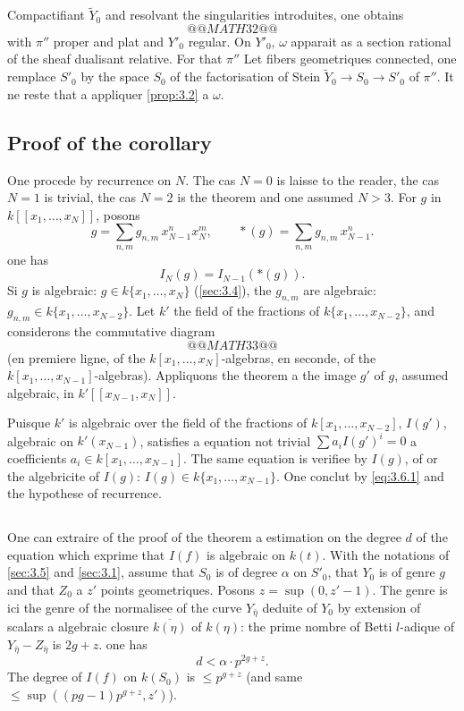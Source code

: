 \documentclass[12pt,a4paper]{article}
\theoremstyle{plain}
\theoremstyle{definition}
\theoremstyle{remark}
\begin{document}
Compactifiant $\widetilde{Y}_0$ and resolvant the singularities introduites, one obtains
\[
@@MATH32@@
\]
with $\pi''$ proper and plat and $Y'_0$ regular. On $Y'_0$, $\omega$ apparait as a section
rational of the sheaf dualisant relative. For that $\pi''$ Let fibers geometriques
connected, one remplace $S'_0$ by the space $S_0$ of the factorisation of Stein
$\widetilde{Y}_0\to S_0\to S'_0$ of $\pi''$. It ne reste that a appliquer \ref{prop:3.2} a $\omega$.

\subsection{Proof of the corollary}\label{sec:3.6}

One procede by recurrence on $N$. The cas $N=0$ is laisse to the reader, the cas $N=1$
is trivial, the cas $N=2$ is the theorem and one assumed $N>3$. For $g$ in
$k[[x_1,\dots,x_N]]$, posons
\[
g=\sum_{n,m}g_{n,m}\,x_{N-1}^n x_N^m,\qquad *(g)=\sum_{n,m}g_{n,m}\,x_{N-1}^n.
\]
one has
\begin{equation}\label{eq:3.6.1}
I_N(g)=I_{N-1}(*(g)).
\end{equation}
Si $g$ is algebraic: $g\in k\{x_1,\dots,x_N\}$ (\ref{sec:3.4}), the $g_{n,m}$ are
algebraic: $g_{n,m}\in k\{x_1,\dots,x_{N-2}\}$. Let $k'$ the field of the fractions of
$k\{x_1,\dots,x_{N-2}\}$, and considerons the commutative diagram
\[
@@MATH33@@
\]
(en premiere ligne, of the $k[x_1,\dots,x_N]$-algebras, en seconde, of the
$k[x_1,\dots,x_{N-1}]$-algebras). Appliquons the theorem a the image $g'$ of $g$,
assumed algebraic, in $k'[[x_{N-1},x_N]]$.

Puisque $k'$ is algebraic over the field of the fractions of
$k[x_1,\dots,x_{N-2}]$, $I(g')$, algebraic on $k'(x_{N-1})$, satisfies a equation not trivial
$\sum a_i I(g')^i=0$ a coefficients $a_i\in k[x_1,\dots,x_{N-1}]$. The same equation is verifiee
by $I(g)$, of or the algebricite of $I(g)$: $I(g)\in k\{x_1,\dots,x_{N-1}\}$. One conclut by
\eqref{eq:3.6.1} and the hypothese of recurrence.

\subsection{}

One can extraire of the proof of the theorem a estimation on the degree $d$
of the equation which exprime that $I(f)$ is algebraic on $k(t)$. With the notations
of \ref{sec:3.5} and \ref{sec:3.1}, assume that $S_0$ is of degree $\alpha$ on $S'_0$, that $Y_0$ is of genre $g$ and
that $Z_0$ a $z'$ points geometriques. Posons $z=\sup(0,z'-1)$. The genre is ici the
genre of the normalisee of the curve $Y_{\bar\eta}$ deduite of $Y_0$ by extension of scalars
a algebraic closure $\overline{k(\eta)}$ of $k(\eta)$: the prime nombre of Betti $l$-adique of
$Y_{\bar\eta}-Z_{\bar\eta}$ is $2g+z$. one has
\begin{equation}\label{eq:3.7.1}
d<\alpha\cdot p^{2g+z}.
\end{equation}
The degree of $I(f)$ on $k(S_0)$ is $\le p^{g+z}$ (and same
$\le\sup((pg-1)p^{g+z},z')$).
\end{document}
